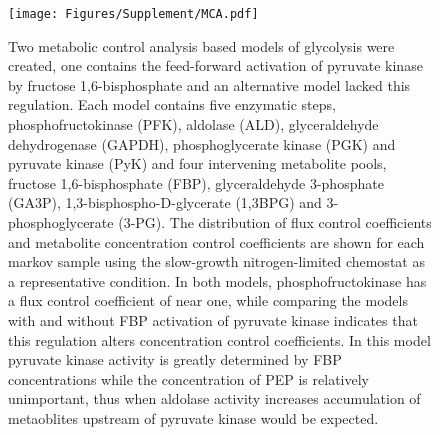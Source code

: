 \documentclass[12pt]{article}\usepackage{graphicx, color}
\begin{document}
\begin{figure}[h!]
\texttt{[image: Figures/Supplement/MCA.pdf]}
\caption{Two metabolic control analysis based models of glycolysis were created, one contains the feed-forward activation of pyruvate kinase by fructose 1,6-bisphosphate and an alternative model lacked this regulation. Each model contains five enzymatic steps, phosphofructokinase (PFK), aldolase (ALD), glyceraldehyde dehydrogenase (GAPDH), phosphoglycerate kinase (PGK) and pyruvate kinase (PyK) and four intervening metabolite pools, fructose 1,6-bisphosphate (FBP), glyceraldehyde 3-phosphate (GA3P), 1,3-bisphospho-D-glycerate (1,3BPG) and 3-phosphoglycerate (3-PG). The distribution of flux control coefficients and metabolite concentration control coefficients are shown for each markov sample using the slow-growth nitrogen-limited chemostat as a representative condition.  In both models, phosphofructokinase has a flux control coefficient of near one, while comparing the models with and without FBP activation of pyruvate kinase indicates that this regulation alters concentration control coefficients. In this model pyruvate kinase activity is greatly determined by FBP concentrations while the concentration of PEP is relatively unimportant, thus when aldolase activity increases accumulation of metaoblites upstream of pyruvate kinase would be expected.}
\label{fig:MCA}
\end{figure}
\end{document}
